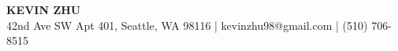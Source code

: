 \documentclass[11pt,letterpaper]{article}
\newcommand{\sectline}{\vspace{5pt}\hrule height 1.5pt\vspace{5pt}}
\newcommand{\sectspace}{\vspace{12pt}}
\begin{document}
\centering
{\fontsize{13pt}{13pt}\selectfont \textbf{KEVIN ZHU}} \vspace{2pt} \\

{\fontsize{11pt}{13pt} 42nd Ave SW Apt 401, Seattle, WA 98116 | kevinzhu98@gmail.com | (510) 706-8515}
\sectspace

\fontsize{11pt}{13pt}\selectfont
\raggedright

\end{document}
